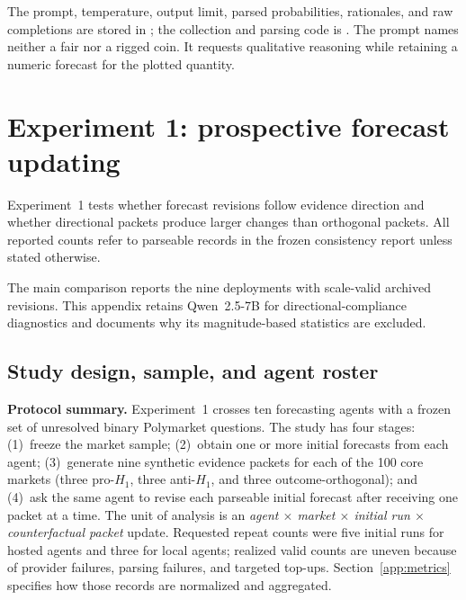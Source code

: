 The prompt, temperature, output limit, parsed probabilities, rationales, and raw
completions are stored in
;
the collection and parsing code is
. The prompt names
neither a fair nor a rigged coin. It requests qualitative reasoning while retaining
a numeric forecast for the plotted quantity.

\section{Experiment 1: prospective forecast updating}
\label{app:exp1}

Experiment~1 tests whether
forecast revisions follow evidence direction and whether directional packets
produce larger changes than orthogonal packets.
All reported counts refer to parseable records in the frozen consistency report
unless stated otherwise.

The main comparison reports the nine deployments with scale-valid archived
revisions. This appendix retains Qwen~2.5-7B for directional-compliance diagnostics
and documents why its magnitude-based statistics are excluded.

\subsection{Study design, sample, and agent roster}
\label{app:exp1-sample}

\noindent\textbf{Protocol summary.}
Experiment~1 crosses ten forecasting agents with a frozen set of unresolved binary
Polymarket questions.  The study has four stages: (1)~freeze the market sample;
(2)~obtain one or more initial forecasts from each agent; (3)~generate nine synthetic
evidence packets for each of the 100 core markets (three pro-$H_1$, three
anti-$H_1$, and three outcome-orthogonal); and (4)~ask the same agent to revise each
parseable initial forecast after receiving one packet at a time.  The unit of analysis is an \emph{agent $\times$ market $\times$ initial run
$\times$ counterfactual packet} update.  Requested repeat
counts were five initial runs for hosted agents and three for local agents; realized
valid counts are uneven because of provider failures, parsing failures, and targeted
top-ups.  Section~\ref{app:metrics} specifies how those records are normalized and
aggregated.


